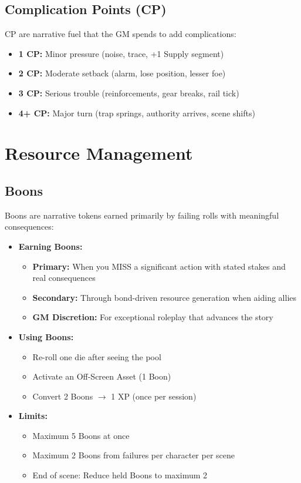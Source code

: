 \documentclass[11pt]{article}
\begin{document}
\subsection{Complication Points (CP)}

CP are narrative fuel that the GM spends to add complications:
\begin{itemize}
\item \textbf{1 CP:} Minor pressure (noise, trace, +1 Supply segment)
\item \textbf{2 CP:} Moderate setback (alarm, lose position, lesser foe)
\item \textbf{3 CP:} Serious trouble (reinforcements, gear breaks, rail tick)
\item \textbf{4+ CP:} Major turn (trap springs, authority arrives, scene shifts)
\end{itemize}

\section{Resource Management}

\subsection{Boons}

Boons are narrative tokens earned primarily by failing rolls with meaningful consequences:

\begin{itemize}
\item \textbf{Earning Boons:}
   \begin{itemize}
   \item \textbf{Primary:} When you MISS a significant action with stated stakes and real consequences
   \item \textbf{Secondary:} Through bond-driven resource generation when aiding allies
   \item \textbf{GM Discretion:} For exceptional roleplay that advances the story
   \end{itemize}
\item \textbf{Using Boons:}
   \begin{itemize}
   \item Re-roll one die after seeing the pool
   \item Activate an Off-Screen Asset (1 Boon)
   \item Convert 2 Boons $\rightarrow$ 1 XP (once per session)
   \end{itemize}
\item \textbf{Limits:}
   \begin{itemize}
   \item Maximum 5 Boons at once
   \item Maximum 2 Boons from failures per character per scene
   \item End of scene: Reduce held Boons to maximum 2
   \end{itemize}
\end{itemize}
\end{document}
